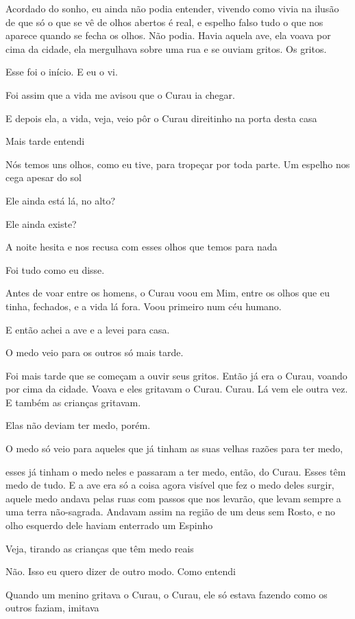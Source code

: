 Acordado do sonho, eu ainda não podia entender, vivendo como vivia na
ilusão de que só o que se vê de olhos abertos é real, e espelho falso
tudo o que nos aparece quando se fecha os olhos. Não podia. Havia aquela
ave, ela voava por cima da cidade, ela mergulhava sobre uma rua e se
ouviam gritos. Os gritos.

Esse foi o início. E eu o vi.

Foi assim que a vida me avisou que o Curau ia chegar.

E depois ela, a vida, veja, veio pôr o Curau direitinho na porta desta
casa

Mais tarde entendi

Nós temos uns olhos, como eu tive, para tropeçar por toda parte. Um
espelho nos cega apesar do sol

Ele ainda está lá, no alto?

Ele ainda existe?

A noite hesita e nos recusa com esses olhos que temos para nada

Foi tudo como eu disse.

Antes de voar entre os homens, o Curau voou em Mim, entre os olhos que
eu tinha, fechados, e a vida lá fora. Voou primeiro num céu humano.

E então achei a ave e a levei para casa.

O medo veio para os outros só mais tarde.

Foi mais tarde que se começam a ouvir seus gritos. Então já era o Curau,
voando por cima da cidade. Voava e eles gritavam o Curau. Curau. Lá vem
ele outra vez. E também as crianças gritavam.

Elas não deviam ter medo, porém.

O medo só veio para aqueles que já tinham as suas velhas razões para ter
medo,

esses já tinham o medo neles e passaram a ter medo, então, do Curau.
Esses têm medo de tudo. E a ave era só a coisa agora visível que fez o
medo deles surgir, aquele medo andava pelas ruas com passos que nos
levarão, que levam sempre a uma terra não-sagrada. Andavam assim na
região de um deus sem Rosto, e no olho esquerdo dele haviam enterrado um
Espinho

Veja, tirando as crianças que têm medo reais

Não. Isso eu quero dizer de outro modo. Como entendi

Quando um menino gritava o Curau, o Curau, ele só estava fazendo como os
outros faziam, imitava


